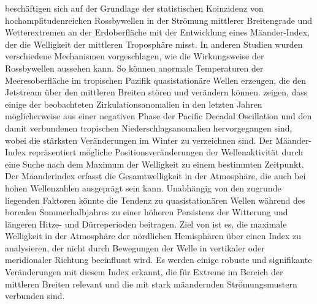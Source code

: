 \citet{dicapua-2016} beschäftigen sich auf der Grundlage der statistischen Koinzidenz von hochamplitudenreichen Rossbywellen in der Strömung mittlerer Breitengrade und Wetterextremen an der Erdoberfläche mit der Entwicklung eines Mäander-Index, der die Welligkeit der mittleren Troposphäre misst. In anderen Studien wurden verschiedene Mechanismen vorgeschlagen, wie die Wirkungsweise der Rossbywellen aussehen kann. So können anormale Temperaturen der Meeresoberfläche im tropischen Pazifik quasistationäre Wellen erzeugen, die den Jetstream über den mittleren Breiten stören und verändern können. \citet{trenberth-2014} zeigen, dass einige der beobachteten  Zirkulationsanomalien in den letzten Jahren möglicherweise aus einer negativen Phase der Pacific Decadal Oscillation und den damit verbundenen tropischen Niederschlagsanomalien hervorgegangen sind, wobei die stärksten Veränderungen im Winter zu verzeichnen sind. Der Mäander-Index repräsentiert mögliche Positionsveränderungen der Wellenaktivität durch eine Suche nach dem Maximum der Welligkeit zu einem bestimmten Zeitpunkt. Der Mäanderindex erfasst die Gesamtwelligkeit in der Atmosphäre, die auch bei hohen Wellenzahlen ausgeprägt sein kann. Unabhängig von den zugrunde liegenden Faktoren könnte die Tendenz zu quasistationären Wellen während des borealen Sommerhalbjahres zu einer höheren Persistenz der Witterung und längeren Hitze- und Dürreperioden beitragen. Ziel von \citet{dicapua-2016} ist es, die maximale Welligkeit in der Atmosphäre der nördlichen Hemisphären über einen Index zu analysieren, der nicht durch Bewegungen der Welle in vertikaler oder meridionaler Richtung beeinflusst wird. Es werden einige robuste und signifikante Veränderungen mit diesem Index erkannt, die für Extreme im Bereich der mittleren Breiten relevant und die mit stark mäandernden Strömungsmustern verbunden sind.

